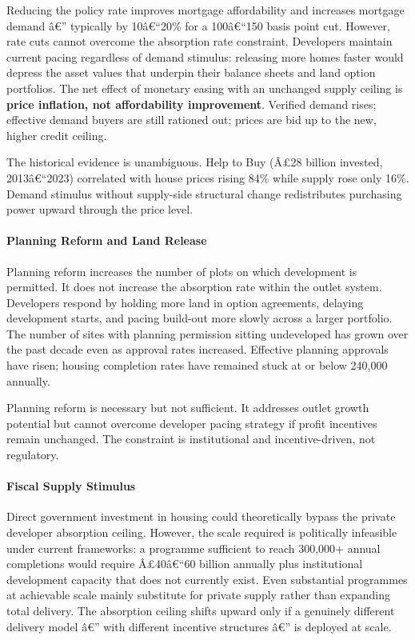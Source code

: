 Reducing the policy rate improves mortgage affordability and increases
mortgage demand â€'' typically by 10â€``20\% for a 100â€``150 basis
point cut. However, rate cuts cannot overcome the absorption rate
constraint. Developers maintain current pacing regardless of demand
stimulus: releasing more homes faster would depress the asset values
that underpin their balance sheets and land option portfolios. The net
effect of monetary easing with an unchanged supply ceiling is
\textbf{price inflation, not affordability improvement}. Verified demand
rises; effective demand buyers are still rationed out; prices are bid up
to the new, higher credit ceiling.

The historical evidence is unambiguous. Help to Buy (Â£28 billion
invested, 2013â€``2023) correlated with house prices rising 84\% while
supply rose only 16\%. Demand stimulus without supply-side structural
change redistributes purchasing power upward through the price level.

\paragraph{Planning Reform and Land
Release}\label{planning-reform-and-land-release}

Planning reform increases the number of plots on which development is
permitted. It does not increase the absorption rate within the outlet
system. Developers respond by holding more land in option agreements,
delaying development starts, and pacing build-out more slowly across a
larger portfolio. The number of sites with planning permission sitting
undeveloped has grown over the past decade even as approval rates
increased. Effective planning approvals have risen; housing completion
rates have remained stuck at or below 240,000 annually.

Planning reform is necessary but not sufficient. It addresses outlet
growth potential but cannot overcome developer pacing strategy if profit
incentives remain unchanged. The constraint is institutional and
incentive-driven, not regulatory.

\paragraph{Fiscal Supply Stimulus}\label{fiscal-supply-stimulus}

Direct government investment in housing could theoretically bypass the
private developer absorption ceiling. However, the scale required is
politically infeasible under current frameworks: a programme sufficient
to reach 300,000+ annual completions would require Â£40â€``60 billion
annually plus institutional development capacity that does not currently
exist. Even substantial programmes at achievable scale mainly substitute
for private supply rather than expanding total delivery. The absorption
ceiling shifts upward only if a genuinely different delivery model â€''
with different incentive structures â€'' is deployed at scale.

